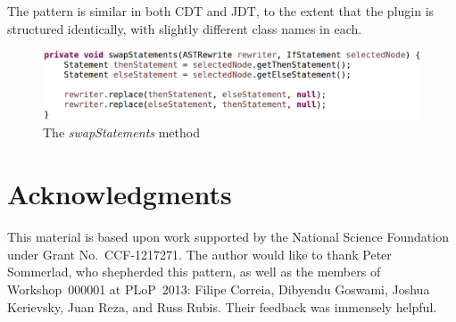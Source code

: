 \documentclass[prodmode]{acmlarge}
\begin{document}
The pattern is similar in both CDT and JDT, to the extent that the plugin is
structured identically, with slightly different class names in each.

\begin{figure}
\begin{center}
\includegraphics[scale=0.30]{swapStatements.eps}
\caption{The \emph{swapStatements} method\vspace*{-4em}}
\label{fig:swapStatements}
\end{center}
\end{figure}

\section*{Acknowledgments}
This material is based upon work supported by the National Science Foundation
under Grant No.~CCF-1217271.  The author would like to thank Peter Sommerlad,
who shepherded this pattern, as well as the members of Workshop~000001 at
PLoP~2013: Filipe Correia, Dibyendu Goswami, Joshua Kerievsky, Juan Reza, and
Russ Rubis.  Their feedback was immensely helpful.




\end{document}
